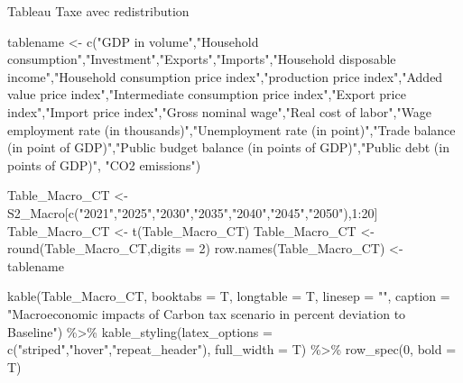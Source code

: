 \documentclass[
]{article}
\newenvironment{Shaded}{\begin{snugshade}}{\end{snugshade}}
\newcommand{\AttributeTok}[1]{\textcolor[rgb]{0.77,0.63,0.00}{#1}}
\newcommand{\DecValTok}[1]{\textcolor[rgb]{0.00,0.00,0.81}{#1}}
\newcommand{\FunctionTok}[1]{\textcolor[rgb]{0.00,0.00,0.00}{#1}}
\newcommand{\NormalTok}[1]{#1}
\newcommand{\OtherTok}[1]{\textcolor[rgb]{0.56,0.35,0.01}{#1}}
\newcommand{\SpecialCharTok}[1]{\textcolor[rgb]{0.00,0.00,0.00}{#1}}
\newcommand{\StringTok}[1]{\textcolor[rgb]{0.31,0.60,0.02}{#1}}
\begin{document}
Tableau Taxe avec redistribution

\begin{Shaded}
\begin{Highlighting}[]
\NormalTok{tablename }\OtherTok{\textless{}{-}} \FunctionTok{c}\NormalTok{(}\StringTok{"GDP in volume"}\NormalTok{,}\StringTok{"Household consumption"}\NormalTok{,}\StringTok{"Investment"}\NormalTok{,}\StringTok{"Exports"}\NormalTok{,}\StringTok{"Imports"}\NormalTok{,}\StringTok{"Household disposable income"}\NormalTok{,}\StringTok{"Household consumption price index"}\NormalTok{,}\StringTok{"production price index"}\NormalTok{,}\StringTok{"Added value price index"}\NormalTok{,}\StringTok{"Intermediate consumption price index"}\NormalTok{,}\StringTok{"Export price index"}\NormalTok{,}\StringTok{"Import price index"}\NormalTok{,}\StringTok{"Gross nominal wage"}\NormalTok{,}\StringTok{"Real cost of labor"}\NormalTok{,}\StringTok{"Wage employment rate (in thousands)"}\NormalTok{,}\StringTok{"Unemployment rate (in point)"}\NormalTok{,}\StringTok{"Trade balance (in point of GDP)"}\NormalTok{,}\StringTok{"Public budget balance (in points of GDP)"}\NormalTok{,}\StringTok{"Public debt (in points of GDP)"}\NormalTok{, }\StringTok{"CO2 emissions"}\NormalTok{)}

\NormalTok{Table\_Macro\_CT }\OtherTok{\textless{}{-}}\NormalTok{ S2\_Macro[}\FunctionTok{c}\NormalTok{(}\StringTok{"2021"}\NormalTok{,}\StringTok{"2025"}\NormalTok{,}\StringTok{"2030"}\NormalTok{,}\StringTok{"2035"}\NormalTok{,}\StringTok{"2040"}\NormalTok{,}\StringTok{"2045"}\NormalTok{,}\StringTok{"2050"}\NormalTok{),}\DecValTok{1}\SpecialCharTok{:}\DecValTok{20}\NormalTok{]}
\NormalTok{Table\_Macro\_CT }\OtherTok{\textless{}{-}} \FunctionTok{t}\NormalTok{(Table\_Macro\_CT)}
\NormalTok{Table\_Macro\_CT }\OtherTok{\textless{}{-}} \FunctionTok{round}\NormalTok{(Table\_Macro\_CT,}\AttributeTok{digits =} \DecValTok{2}\NormalTok{)}
\FunctionTok{row.names}\NormalTok{(Table\_Macro\_CT) }\OtherTok{\textless{}{-}}\NormalTok{ tablename}

\FunctionTok{kable}\NormalTok{(Table\_Macro\_CT, }\AttributeTok{booktabs =}\NormalTok{ T, }\AttributeTok{longtable =}\NormalTok{ T, }\AttributeTok{linesep =} \StringTok{""}\NormalTok{, }\AttributeTok{caption =} \StringTok{"Macroeconomic impacts of Carbon tax scenario in percent deviation to Baseline"}\NormalTok{) }\SpecialCharTok{\%\textgreater{}\%} 
\FunctionTok{kable\_styling}\NormalTok{(}\AttributeTok{latex\_options =} \FunctionTok{c}\NormalTok{(}\StringTok{"striped"}\NormalTok{,}\StringTok{"hover"}\NormalTok{,}\StringTok{"repeat\_header"}\NormalTok{), }\AttributeTok{full\_width =}\NormalTok{ T) }\SpecialCharTok{\%\textgreater{}\%} 
\FunctionTok{row\_spec}\NormalTok{(}\DecValTok{0}\NormalTok{, }\AttributeTok{bold =}\NormalTok{ T)}
\end{Highlighting}
\end{Shaded}
\end{document}
